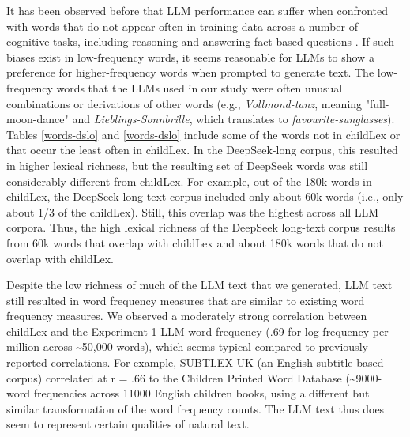 \documentclass[manuscript]{stjour}
\begin{document}
It has been observed before that LLM performance can suffer when confronted with words that do not appear often in training data across a number of cognitive tasks, including reasoning \cite{razeghi_impact_2022} and answering fact-based questions \cite{kandpal_large_2023}. If such biases exist in low-frequency words, it seems reasonable for LLMs to show a preference for higher-frequency words when prompted to generate text. The low-frequency words that the LLMs used in our study were often unusual combinations or derivations of other words (e.g., \textit{Vollmond-tanz}, meaning "full-moon-dance" and \textit{Lieblings-Sonnbrille}, which translates to \textit{favourite-sunglasses}). Tables \ref{words-dslo} and \ref{words-dslo} include some of the words not in childLex or that occur the least often in childLex. In the DeepSeek-long corpus, this resulted in higher lexical richness, but the resulting set of DeepSeek words was still considerably different from childLex. For example, out of the 180k words in childLex, the DeepSeek long-text corpus included only about 60k words (i.e., only about 1/3 of the childLex). Still, this overlap was the highest across all LLM corpora. Thus, the high lexical richness of the DeepSeek long-text corpus results from 60k words that overlap with childLex and about 180k words that do not overlap with childLex.

Despite the low richness of much of the LLM text that we generated, LLM text still resulted in word frequency measures that are similar to existing word frequency measures. We observed a moderately strong correlation between childLex and the Experiment 1 LLM word frequency (.69 for log-frequency per million across \textasciitilde 50,000 words), which seems typical compared to previously reported correlations. For example, SUBTLEX-UK (an English subtitle-based corpus) correlated at r = .66 to the Children Printed Word Database (\textasciitilde 9000-word frequencies across 11000 English children books, \citep{van_heuven_subtlex-uk_2014} using a different but similar transformation of the word frequency counts. The LLM text thus does seem to represent certain qualities of natural text. 
\end{document}
